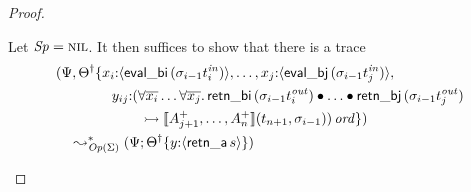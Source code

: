 \begin{proof}
\begin{itemize}
  \bigskip
  Let ${\it Sp} = \textsc{nil}$. It then suffices to show that there is a trace
\begin{align*}
    &(\Psi, {{\Theta}^\dag} \{
        x_i{:}\langle {{\sf eval\_bi}\,({\sigma_{i-1}}t^{\it in}_i)} \rangle, \ldots,
    x_j{:}\langle {{\sf eval\_bj}\,({\sigma_{i-1}}t^{\it in}_j)} \rangle,
  \\
  & \qquad\qquad y_{ij}{:}(\forall\overline{x_i}\ldots\forall\overline{x_j}.\, 
     {\sf retn\_bi}\,(\sigma_{i-1}{t^{\it out}_i})
     \mathbin{\bullet} \ldots \mathbin{\bullet} 
     {\sf retn\_bj}\,(\sigma_{i-1}{t^{\it out}_j})\\
  & \qquad\qquad\qquad
      \rightarrowtail \llbracket {A^+_{j+1},\ldots,A^+_n} \rrbracket({t_{n+1}},{\sigma_{i-1}}))\,{\it ord}
       \})
  \\
  & \quad \leadsto^*_{{\it Op}({\Sigma})} 
     (\Psi; {{{\Theta}^\dag}}\{{y{:}\langle {{\sf retn\_a}\,s} \rangle}\})
\end{align*}


\end{itemize}
\end{proof}
